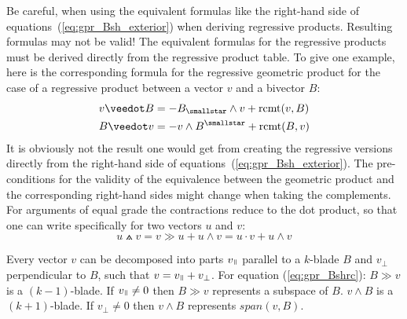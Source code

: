 Be careful, when using the equivalent formulas like the right-hand side of
equations~(\ref{eq:gpr_Bsh_exterior}) when deriving regressive products. Resulting
formulas may not be valid! The equivalent formulas for the regressive products must be
derived directly from the regressive product table. To give one example, here is the
corresponding formula for the regressive geometric product for the case of a regressive
product between a vector $v$ and a bivector $B$:
\begin{subequations}
    \begin{align}
    v \veedot B & = -\leftweightdual{B} \wedge v + \mathrm{rcmt}(v,B) \\
    B \veedot v & = -v \wedge \rightweightdual{B}  + \mathrm{rcmt}(B,v)
    \end{align}
\end{subequations}
It is obviously not the result one would get from creating the regressive versions
directly from the right-hand side of equations~(\ref{eq:gpr_Bsh_exterior}). The
pre-conditions for the validity of the equivalence between the geometric product and the
corresponding right-hand sides might change when taking the complements. \\

For arguments of equal grade the contractions reduce to the dot product, so that one can
write specifically for two vectors $u$ and $v$:
\begin{equation}
    u \wedgedot v =  v \gg u + u \wedge v =  u \cdot v + u \wedge v 
\end{equation}

Every vector $v$ can be decomposed into parts $v_{\parall}$ parallel to a $k$-blade $B$
and $v_{\perp}$ perpendicular to $B$, such that $v = v_{\parall} + v_{\perp}$. For
equation {(\ref{eq:gpr_Bshrc})}: $B \gg v$ is a $(k-1)$-blade. If $v_{\parall} \neq 0$
then $B \gg v$ represents a subspace of $B$. $v \wedge B$ is a $(k+1)$-blade. If
$v_{\perp} \neq 0$ then $v \wedge B$ represents $span(v,B)$. \\

